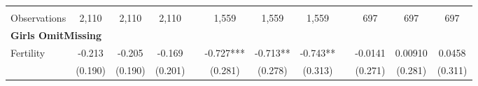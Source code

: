 \begin{landscape}
\begin{table}[htpb!]
\begin{center}
\begin{tabular}{lcccp{2mm}cccp{2mm}ccc}
\begin{footnotesize}\end{footnotesize}&\begin{footnotesize}\end{footnotesize}&\begin{footnotesize}\end{footnotesize}&\begin{footnotesize}\end{footnotesize}&\begin{footnotesize}\end{footnotesize}&\begin{footnotesize}\end{footnotesize}&\begin{footnotesize}\end{footnotesize}&\begin{footnotesize}\end{footnotesize}&\begin{footnotesize}\end{footnotesize}&\begin{footnotesize}\end{footnotesize}&\begin{footnotesize}\end{footnotesize}&\begin{footnotesize}\end{footnotesize}\\Observations&2,110&2,110&2,110&&1,559&1,559&1,559&&697&697&697\\
\multicolumn{12}{l}{\textbf{Girls OmitMissing}}\\ 
Fertility&-0.213&-0.205&-0.169&&-0.727***&-0.713**&-0.743**&&-0.0141&0.00910&0.0458\\
&(0.190)&(0.190)&(0.201)&&(0.281)&(0.278)&(0.313)&&(0.271)&(0.281)&(0.311)\\

\end{tabular}
\end{center}
\end{table}
\end{landscape}
